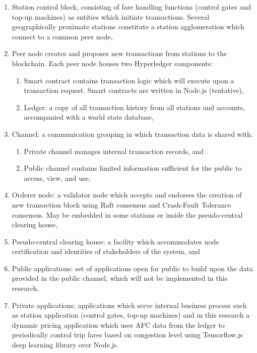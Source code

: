 \documentclass[a4paper,12pt,oneside, utf8x]{report}
\begin{document}
\begin{enumerate}
\begin{enumerate}
\item Station control block, consisting of fare handling functions (control gates and top-up machines) as entities which initiate transactions. Several geographically proximate stations constitute a station agglomeration which connect to a common peer node,
\item Peer node creates and proposes new transactions from stations to the blockchain. Each peer node houses two Hyperledger components:
\begin{enumerate}
\item Smart contract contains transaction logic which will execute upon a transaction request. Smart contracts are written in Node.js (tentative),
\item Ledger: a copy of all transaction history from all stations and accounts, accompanied with a world state database,
\end{enumerate}
\item Channel: a communication grouping in which transaction data is shared with.
\begin{enumerate}
\item Private channel manages internal transaction records, and
\item Public channel contains limited information sufficient for the public to access, view, and use,
\end{enumerate}
\item Orderer node: a validator node which accepts and endorses the creation of new transaction block using Raft consensus and Crash-Fault Tolerance consensus. May be embedded in some stations or inside the pseudo-central clearing house,
\item Pseudo-central clearing house: a facility which accommodates node certification and identities of stakeholders of the system, and
\item Public applications: set of applications open for public to build upon the data provided in the public channel, which will not be implemented in this research,
\item Private applications: applications which serve internal business process such as station application (control gates, top-up machines) and in this research a dynamic pricing application which uses AFC data from the ledger to periodically control trip fares based on congestion level using Tensorflow.js deep learning library over Node.js.
\end{enumerate}


\end{enumerate}
\end{document}
